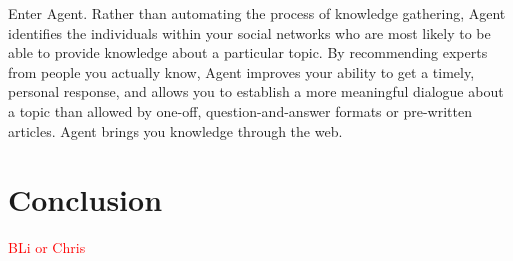 \documentclass[11pt]{article}
\newcommand\todo[1]{\textcolor{red}{#1}}
\begin{document}
Enter Agent. Rather than automating the process of knowledge gathering, Agent
identifies the individuals within your social networks who are most likely to be
able to provide knowledge about a particular topic. By recommending experts
from people you actually know, Agent improves your ability to get a timely,
personal response, and allows you to establish a more meaningful dialogue about
a topic than allowed by one-off, question-and-answer formats or pre-written
articles. Agent brings you knowledge through the web.






\section{Conclusion}
\label{sec:conclusion}
\todo{BLi or Chris}



\end{document}
